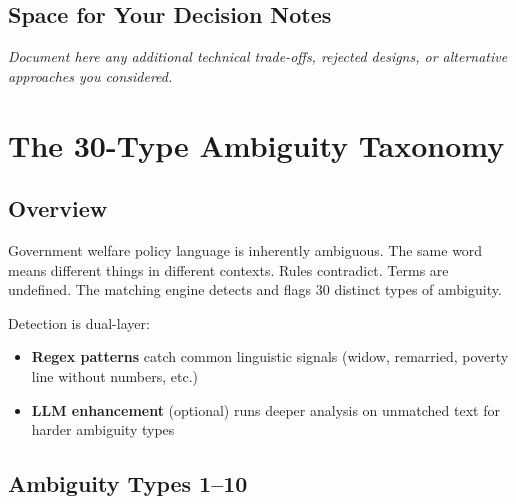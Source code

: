 \documentclass[11pt,a4paper]{report}
\newenvironment{notebox}{%
  \begin{callout}%
}{%
  \end{callout}%
}
\begin{document}
\section{Space for Your Decision Notes}

\begin{notebox}
\Large\vspace{2.5cm}

\noindent\textcolor{dark}{\emph{Document here any additional technical trade-offs, rejected designs, or alternative approaches you considered.}}

\vspace{2.5cm}
\end{notebox}

\chapter{The 30-Type Ambiguity Taxonomy}

\section{Overview}

Government welfare policy language is inherently ambiguous. The same word means different things in different contexts. Rules contradict. Terms are undefined. The matching engine detects and flags 30 distinct types of ambiguity.

Detection is dual-layer:
\begin{itemize}
  \item \textbf{Regex patterns} catch common linguistic signals (widow, remarried, poverty line without numbers, etc.)
  \item \textbf{LLM enhancement} (optional) runs deeper analysis on unmatched text for harder ambiguity types
\end{itemize}

\section{Ambiguity Types 1--10}
\end{document}
